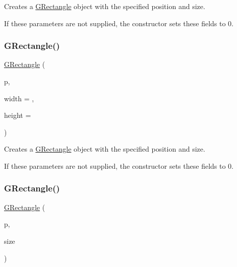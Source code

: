Creates a {\ttfamily \mbox{\hyperlink{structGRectangle}{G\+Rectangle}}} object with the specified position and size. 

If these parameters are not supplied, the constructor sets these fields to 0. \mbox{\label{structGRectangle_a68fa0886a48ee516b8897997c767e504}} 
\subsubsection{\texorpdfstring{G\+Rectangle()}{GRectangle()}\hspace{0.1cm}{\footnotesize\ttfamily [3/4]}}
{\footnotesize\ttfamily \mbox{\hyperlink{structGRectangle}{G\+Rectangle}} (\begin{DoxyParamCaption}\item[{const \mbox{\hyperlink{structGPoint}{G\+Point}} \&}]{p,  }\item[{double}]{width = {},  }\item[{double}]{height = {} }\end{DoxyParamCaption})}



Creates a {\ttfamily \mbox{\hyperlink{structGRectangle}{G\+Rectangle}}} object with the specified position and size. 

If these parameters are not supplied, the constructor sets these fields to 0. \mbox{\label{structGRectangle_a90356cb96943b1a130aa934f150265a7}} 
\subsubsection{\texorpdfstring{G\+Rectangle()}{GRectangle()}\hspace{0.1cm}{\footnotesize\ttfamily [4/4]}}
{\footnotesize\ttfamily \mbox{\hyperlink{structGRectangle}{G\+Rectangle}} (\begin{DoxyParamCaption}\item[{const \mbox{\hyperlink{structGPoint}{G\+Point}} \&}]{p,  }\item[{const \mbox{\hyperlink{structGDimension}{G\+Dimension}} \&}]{size }\end{DoxyParamCaption})}



